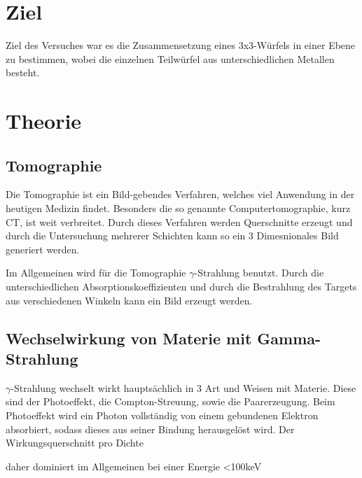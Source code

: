 \section{Ziel}
Ziel des Versuches war es die Zusammensetzung eines 3x3-Würfels in einer Ebene zu bestimmen, wobei die einzelnen Teilwürfel aus unterschiedlichen Metallen besteht. 

\section{Theorie}
\subsection{Tomographie}
Die Tomographie ist ein Bild-gebendes Verfahren, welches viel Anwendung in der heutigen Medizin findet. Besonders die so genannte Computertomographie, kurz CT, ist weit 
verbreitet.
Durch dieses Verfahren werden Querschnitte erzeugt und durch die Untersuchung mehrerer Schichten kann so ein 3 Dimesnionales Bild generiert werden.

\noindent
Im Allgemeinen wird für die Tomographie $\gamma$-Strahlung benutzt. Durch die unterschiedlichen Absorptionskoeffizienten und durch die Bestrahlung des Targets aus 
verschiedenen Winkeln kann ein Bild erzeugt werden.

\subsection{Wechselwirkung von Materie mit Gamma-Strahlung}
$\gamma$-Strahlung wechselt wirkt hauptsächlich in 3 Art und Weisen mit Materie. Diese sind der Photoeffekt, die Compton-Streuung, sowie die Paarerzeugung.
Beim Photoeffekt wird ein Photon vollständig von einem gebundenen Elektron absorbiert, sodass dieses aus seiner Bindung herausgelöst wird. 
Der Wirkungsquerschnitt pro Dichte 

daher dominiert im Allgemeinen bei einer Energie <100keV 




